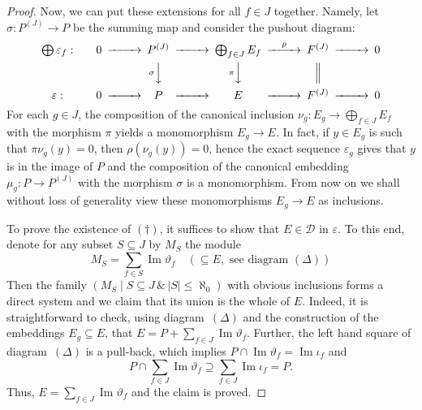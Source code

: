\documentclass[a4paper,11pt]{amsart}
\DeclareMathOperator{\Img}{Im}
\newcommand{\D}{\mathcal{D}}
\newcommand{\card}[1]{\left\lvert{#1}\right\rvert}
\theoremstyle{plain}
\theoremstyle{definition}
\theoremstyle{remark}
\begin{document}
\begin{proof}
Now, we can put these extensions for all $f \in J$ together. Namely, let $\sigma: P^{(J)} \to P$ be the summing map and consider the pushout diagram:
%
$$
\begin{CD}
\bigoplus \varepsilon_f: \qquad
@.   0   @>>>   P^{(J)}   @>>>   \bigoplus_{f \in J} E_f   @>{\rho}>>   F^{(J)}   @>>>   0   \\
  @. @.      @V{\sigma}VV               @V{\pi}VV                   @|                 \\
\varepsilon: \qquad
@.   0   @>>>      P      @>>>              E              @>>>   F^{(J)}   @>>>   0
\end{CD}
$$
%
For each $g \in J$, the composition of the canonical inclusion $\nu_g\colon E_g \to \bigoplus_{f \in J} E_f$ with the morphism $\pi$ yields a monomorphism $E_g \to E$. In fact, if $y\in E_g$ is such that $\pi \nu_g(y)=0$, then $\rho(\nu_g(y))=0$, hence the exact sequence $\varepsilon_g$ gives that $y$ is in the image of $P$ and the composition of the canonical embedding $\mu_g\colon P \to P^{(J)}$ with the morphism $\sigma$ is a monomorphism. From now on we shall without loss of generality view these monomorphisms $E_g \to E$ as inclusions.

To prove the existence of $(\dag)$, it suffices to show that $E \in \D$ in $\varepsilon$. To this end, denote for any subset $S \subseteq J$ by $M_S$ the module
%
$$ M_S = \sum_{f \in S} \Img \vartheta_f \quad (\subseteq E, \textrm{ see diagram } (\Delta)) $$
%
Then the family $(M_S \mid S \subseteq J \,\&\, \card{S} \le \aleph_0)$ with obvious inclusions forms a direct system and we claim that its union is the whole of $E$. Indeed, it is straightforward to check, using diagram~$(\Delta)$ and the construction of the embeddings $E_g \subseteq E$, that $E = P + \sum_{f \in J} \Img \vartheta_f$. Further, the left hand square of diagram~$(\Delta)$ is a pull-back, which implies $P \cap \Img \vartheta_f = \Img \iota_f$ and
%
$$ P \cap \sum_{f \in J} \Img \vartheta_f \supseteq \sum_{f \in J} \Img \iota_f = P. $$
%
Thus, $E = \sum_{f \in J} \Img \vartheta_f$ and the claim is proved.


\end{proof}
\end{document}
